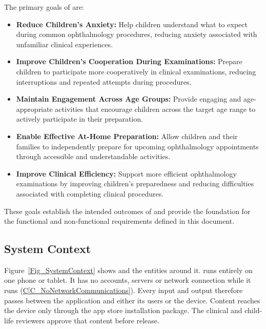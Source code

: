\documentclass[10pt]{article}
\newcommand{\conref}[1]{\hyperref[#1]{C\ref*{#1}}}
\begin{document}
The primary goals of \progname{} are:

\begin{itemize}
    \item \textbf{Reduce Children's Anxiety:}
    Help children understand what to expect during common ophthalmology
    procedures, reducing anxiety associated with unfamiliar clinical
    experiences.

    \item \textbf{Improve Children's Cooperation During Examinations:}
    Prepare children to participate more cooperatively in clinical
    examinations, reducing interruptions and repeated attempts
    during procedures.

    \item \textbf{Maintain Engagement Across Age Groups:}
    Provide engaging and age-appropriate activities that encourage
    children across the target age range to actively participate
    in their preparation.

    \item \textbf{Enable Effective At-Home Preparation:}
    Allow children and their families to independently prepare
    for upcoming ophthalmology appointments through accessible
    and understandable activities.

    \item \textbf{Improve Clinical Efficiency:}
    Support more efficient ophthalmology examinations by improving
    children's preparedness and reducing difficulties associated
    with completing clinical procedures.
\end{itemize}

These goals establish the intended outcomes of \progname{} and provide
the foundation for the functional and non-functional requirements
defined in this document.
  
\subsection{System Context}
\label{sec_SystemContext}

Figure~\ref{Fig_SystemContext} shows \progname{} and the entities around it.
\progname{} runs entirely on one phone or tablet. It has no accounts, servers or
network connection while it runs (\conref{C_NoNetworkCommunications}). Every
input and output therefore passes between the application and either its users
or the device. Content reaches the device only through the app store
installation package. The clinical and child-life reviewers approve that
content before release.
\end{document}
